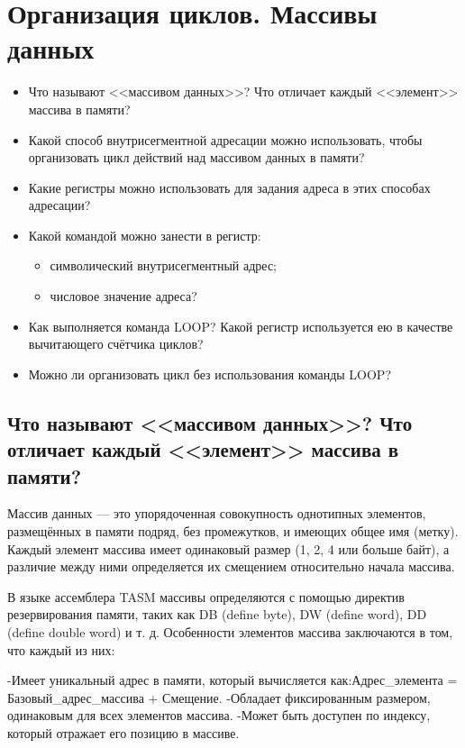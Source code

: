 \chapter{Организация циклов. Массивы данных}
\begin{itemize}
\item Что называют <<массивом данных>>? Что отличает каждый <<элемент>> массива в памяти?
\item Какой способ внутрисегментной адресации можно использовать, чтобы организовать цикл действий над массивом данных в памяти?
\item Какие регистры можно использовать для задания адреса в этих способах адресации?
\item Какой командой можно занести в регистр:
    \begin{itemize}
    \item символический внутрисегментный адрес;
    \item числовое значение адреса?
    \end{itemize}
\item Как выполняется команда LOOP? Какой регистр используется ею в качестве вычитающего счётчика циклов?
\item Можно ли организовать цикл без использования команды LOOP?
\end{itemize}

\section{Что называют <<массивом данных>>? Что отличает каждый <<элемент>> массива в памяти?}

Массив данных — это упорядоченная совокупность однотипных элементов, размещённых в памяти подряд, без промежутков, и имеющих общее имя (метку). Каждый элемент массива имеет одинаковый размер (1, 2, 4 или больше байт), а различие между ними определяется их смещением относительно начала массива.

В языке ассемблера TASM массивы определяются с помощью директив резервирования памяти, таких как DB (define byte), DW (define word), DD (define double word) и т. д.
Особенности элементов массива заключаются в том, что каждый из них:

-Имеет уникальный адрес в памяти, который вычисляется как:Адрес_элемента = Базовый_адрес_массива + Смещение.
-Обладает фиксированным размером, одинаковым для всех элементов массива.
-Может быть доступен по индексу, который отражает его позицию в массиве.


